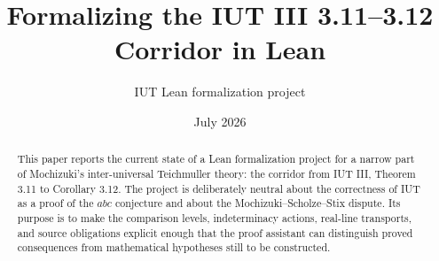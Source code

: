 \documentclass[11pt]{article}
\title{Formalizing the IUT III 3.11--3.12 Corridor in Lean}
\author{IUT Lean formalization project}
\date{July 2026}
\newcommand{\IUT}{IUT}
\newcommand{\Lean}{Lean}
\theoremstyle{plain}
\theoremstyle{definition}
\theoremstyle{remark}
\begin{document}
\maketitle
\sloppy

\begin{abstract}
This paper reports the current state of a \Lean{} formalization project for a
narrow part of Mochizuki's inter-universal Teichmuller theory: the corridor
from \IUT{} III, Theorem 3.11 to Corollary 3.12.  The project is deliberately
neutral about the correctness of \IUT{} as a proof of the \(abc\) conjecture and
about the Mochizuki--Scholze--Stix dispute.  Its purpose is to make the
comparison levels, indeterminacy actions, real-line transports, and source
obligations explicit enough that the proof assistant can distinguish proved
consequences from mathematical hypotheses still to be constructed.


\end{abstract}
\end{document}
